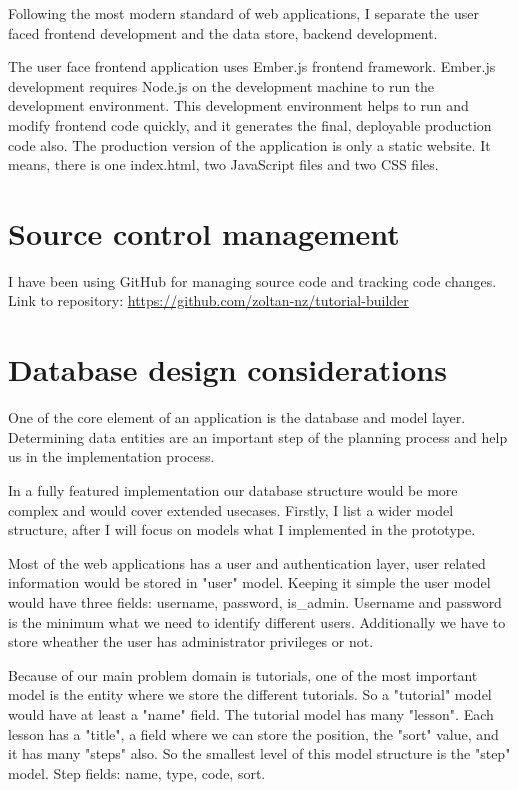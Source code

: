 \documentclass[12pt, a4paper, oneside, openright, medskipamount]{report}
\begin{document}
Following the most modern standard of web applications, I separate the user faced frontend development and the data store, backend development.

The user face frontend application uses Ember.js frontend framework. Ember.js development requires Node.js on the development machine to run the development environment. This development environment helps to run and modify frontend code quickly, and it generates the final, deployable production code also. The production version of the application is only a static website. It means, there is one index.html, two JavaScript files and two CSS files.

\section{Source control management}

I have been using GitHub for managing source code and tracking code changes. Link to repository: \url{https://github.com/zoltan-nz/tutorial-builder}

\section{Database design considerations}

One of the core element of an application is the database and model layer. Determining data entities are an important step of the planning process and help us in the implementation process.

In a fully featured implementation our database structure would be more complex and would cover extended usecases. Firstly, I list a wider model structure, after I will focus on models what I implemented in the prototype.

Most of the web applications has a user and authentication layer, user related information would be stored in "user" model. Keeping it simple the user model would have three fields: username, password, is\_admin. Username and password is the minimum what we need to identify different users. Additionally we have to store wheather the user has administrator privileges or not.

Because of our main problem domain is tutorials, one of the most important model is the entity where we store the different tutorials. So a "tutorial" model would have at least a "name" field. The tutorial model has many "lesson". Each lesson has a "title", a field where we can store the position, the "sort" value, and it has many "steps" also. So the smallest level of this model structure is the "step" model. Step fields: name, type, code, sort.
\end{document}
